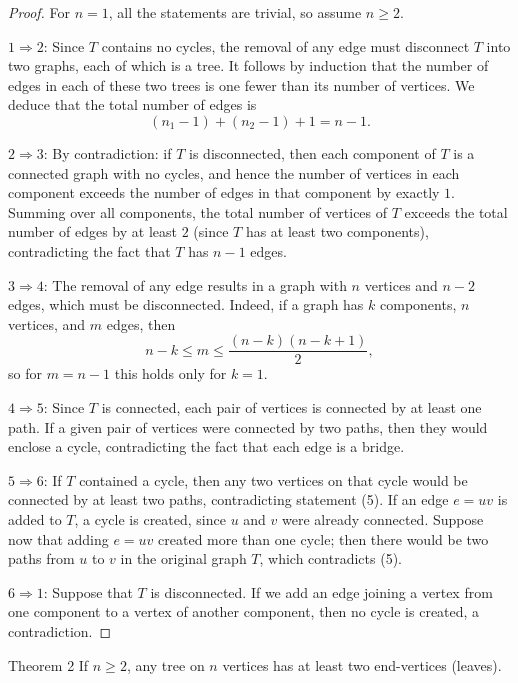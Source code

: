 \begin{proof}
For $n=1$, all the statements are trivial, so assume $n \geq 2$.

\smallskip
\noindent $1 \Rightarrow 2$: Since $T$ contains no cycles, the removal of any edge must disconnect $T$ into two graphs, each of which is a tree. It follows by induction that the number of edges in each of these two trees is one fewer than its number of vertices. We deduce that the total number of edges is
$$(n_1 - 1) + (n_2 - 1) + 1 = n - 1.$$

\smallskip
\noindent $2 \Rightarrow 3$: By contradiction: if $T$ is disconnected, then each component of $T$ is a connected graph with no cycles, and hence the number of vertices in each component exceeds the number of edges in that component by exactly $1$. Summing over all components, the total number of vertices of $T$ exceeds the total number of edges by at least $2$ (since $T$ has at least two components), contradicting the fact that $T$ has $n-1$ edges.

\smallskip
\noindent $3 \Rightarrow 4$: The removal of any edge results in a graph with $n$ vertices and $n-2$ edges, which must be disconnected. Indeed, if a graph has $k$ components, $n$ vertices, and $m$ edges, then
$$n-k \leq m \leq \frac{(n-k)(n-k+1)}{2},$$
so for $m = n-1$ this holds only for $k=1$.

\smallskip
\noindent $4 \Rightarrow 5$: Since $T$ is connected, each pair of vertices is connected by at least one path. If a given pair of vertices were connected by two paths, then they would enclose a cycle, contradicting the fact that each edge is a bridge.

\smallskip
\noindent $5 \Rightarrow 6$: If $T$ contained a cycle, then any two vertices on that cycle would be connected by at least two paths, contradicting statement (5). If an edge $e = uv$ is added to $T$, a cycle is created, since $u$ and $v$ were already connected. Suppose now that adding $e = uv$ created more than one cycle; then there would be two paths from $u$ to $v$ in the original graph $T$, which contradicts (5).

\smallskip
\noindent $6 \Rightarrow 1$: Suppose that $T$ is disconnected. If we add an edge joining a vertex from one component to a vertex of another component, then no cycle is created, a contradiction.
\end{proof}

\begin{thmbox}{Theorem 2}
If $n \geq 2$, any tree on $n$ vertices has at least two end-vertices (leaves).
\end{thmbox}

